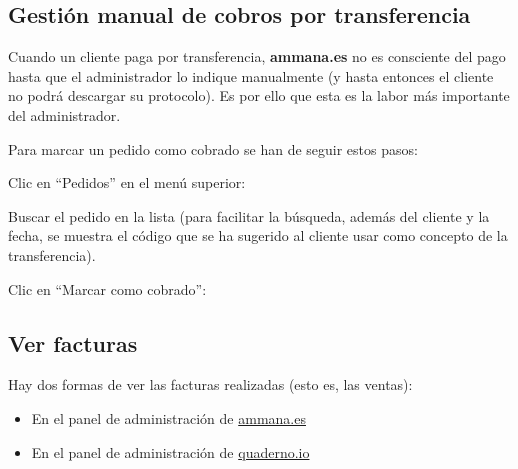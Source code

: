 \documentclass[12pt, spanish]{article}
\newcommand{\screenshot}[2][1]{

        \medskip
        \begin{minipage}[t]{\linewidth}
            \raggedright
            \adjustbox{valign=t}{%
                \fbox{\texttt{[image: \#2]}}
            }
        \end{minipage}
}
\begin{document}

    \newpage

    \subsection{Gestión manual de cobros por transferencia}

    \label{sec:mark-orders-as-paid}

            Cuando un cliente paga por transferencia, \textbf{ammana.es} no es consciente del
        pago hasta que el administrador lo indique manualmente (y hasta entonces el cliente no
        podrá descargar su protocolo). Es por ello que esta es la labor más importante del
        administrador.

            Para marcar un pedido como cobrado se han de seguir estos pasos:

    \begin{steps}

        \item Clic en ``Pedidos'' en el menú superior:
            \screenshot{mark-paid/1.png}

        \item Buscar el pedido en la lista (para facilitar la búsqueda, además del cliente y
            la fecha, se muestra el código que se ha sugerido al cliente usar como concepto
            de la transferencia).

        \item Clic en ``Marcar como cobrado'':
            \screenshot{mark-paid/2.png}

    \end{steps}


    \newpage

    \subsection{Ver facturas}

    \label{sec:invoices}

        Hay dos formas de ver las facturas realizadas (esto es, las ventas):

        \begin{itemize}
            \item En el panel de administración de \url{ammana.es}
            \item En el panel de administración de \url{quaderno.io}
        \end{itemize}
\end{document}
